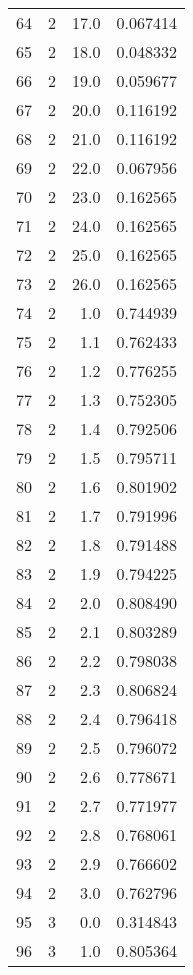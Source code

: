 \begin{tabular}{lrrr}
64  &        2 &     17.0 &  0.067414 \\
65  &        2 &     18.0 &  0.048332 \\
66  &        2 &     19.0 &  0.059677 \\
67  &        2 &     20.0 &  0.116192 \\
68  &        2 &     21.0 &  0.116192 \\
69  &        2 &     22.0 &  0.067956 \\
70  &        2 &     23.0 &  0.162565 \\
71  &        2 &     24.0 &  0.162565 \\
72  &        2 &     25.0 &  0.162565 \\
73  &        2 &     26.0 &  0.162565 \\
74  &        2 &      1.0 &  0.744939 \\
75  &        2 &      1.1 &  0.762433 \\
76  &        2 &      1.2 &  0.776255 \\
77  &        2 &      1.3 &  0.752305 \\
78  &        2 &      1.4 &  0.792506 \\
79  &        2 &      1.5 &  0.795711 \\
80  &        2 &      1.6 &  0.801902 \\
81  &        2 &      1.7 &  0.791996 \\
82  &        2 &      1.8 &  0.791488 \\
83  &        2 &      1.9 &  0.794225 \\
84  &        2 &      2.0 &  0.808490 \\
85  &        2 &      2.1 &  0.803289 \\
86  &        2 &      2.2 &  0.798038 \\
87  &        2 &      2.3 &  0.806824 \\
88  &        2 &      2.4 &  0.796418 \\
89  &        2 &      2.5 &  0.796072 \\
90  &        2 &      2.6 &  0.778671 \\
91  &        2 &      2.7 &  0.771977 \\
92  &        2 &      2.8 &  0.768061 \\
93  &        2 &      2.9 &  0.766602 \\
94  &        2 &      3.0 &  0.762796 \\
95  &        3 &      0.0 &  0.314843 \\
96  &        3 &      1.0 &  0.805364 \\

\end{tabular}
